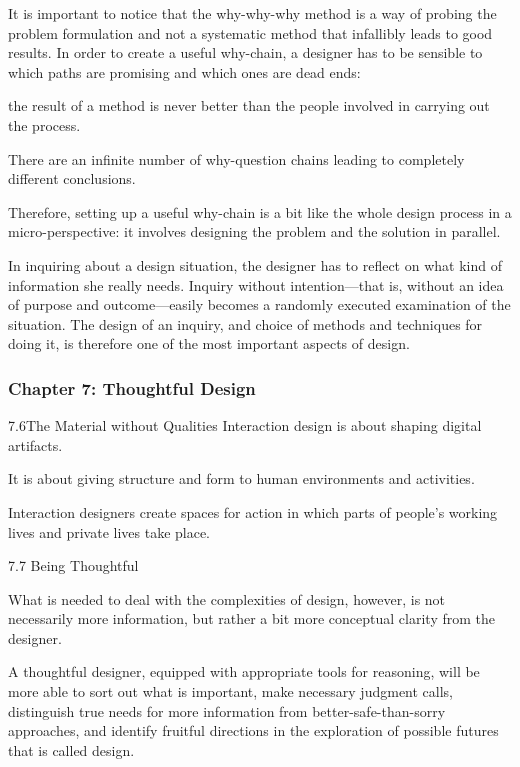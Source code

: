 It is important to notice that the why-why-why method is a way of probing the problem formulation and not a systematic method that infallibly leads to good results. In order to create a useful why-chain, a designer has to be sensible to which paths are promising and which ones are dead ends:



the result of a method is never better than the people involved in carrying out the process.

There are an infinite number of why-question chains leading to completely different conclusions.

Therefore, setting up a useful why-chain is a bit like the whole design process in a micro-perspective: it involves designing the problem and the solution in parallel.

In inquiring about a design situation, the designer has to reflect on what kind of information she really needs. Inquiry without intention—that is, without an idea of purpose and outcome—easily becomes a randomly executed examination of the situation. The design of an inquiry, and choice of methods and techniques for doing it, is therefore one of the most important aspects of design.

\subsubsection{Chapter 7: Thoughtful Design}

7.6The Material without Qualities
Interaction design is about shaping digital artifacts.

It is about giving structure and form to human environments and activities.

Interaction designers create spaces for action in which parts of people’s working lives and private lives take place.

7.7 Being Thoughtful

What is needed to deal with the complexities of design, however, is not necessarily more information, but rather a bit more conceptual clarity from the designer.

A thoughtful designer, equipped with appropriate tools for reasoning, will be more able to sort out what is important, make necessary judgment calls, distinguish true needs for more information from better-safe-than-sorry approaches, and identify fruitful directions in the exploration of possible futures that is called design.

